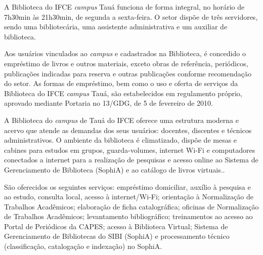 \documentclass[
	12pt,				%
	openright,			%
	twoside,			%
	a4paper,			%
	chapter=TITLE,		%
	english,			%
	french,				%
	spanish,			%
	brazil,				%
	]{abntex2}
\begin{document}
A Biblioteca do IFCE \textit{campus} Tauá funciona de forma integral, no horário de 7h30min às 21h30min, de segunda a sexta-feira. O setor dispõe de três servidores, sendo uma bibliotecária,  uma assistente administrativa e um auxiliar de biblioteca.

Aos usuários vinculados ao \textit{campus} e cadastrados na Biblioteca, é concedido o empréstimo de livros e outros materiais, exceto obras de referência, periódicos, publicações indicadas para reserva e outras publicações conforme recomendação do setor. As formas de empréstimo, bem como o uso e oferta de serviços da Biblioteca do IFCE \textit{campus} Tauá, são estabelecidos em regulamento próprio, aprovado mediante Portaria no 13/GDG, de 5 de fevereiro de 2010. 

A Biblioteca do \textit{campus} de Tauá do IFCE oferece uma estrutura moderna e acervo que atende as demandas dos seus usuários: docentes, discentes e técnicos administrativos. O ambiente da biblioteca é climatizado, dispõe de mesas e cabines para estudos em grupos, guarda-volumes, internet Wi-Fi e computadores conectados a internet para a realização de pesquisas e acesso online ao Sistema de Gerenciamento de Biblioteca (SophiA) e ao catálogo de livros virtuais..

São oferecidos os seguintes serviços: empréstimo domiciliar, auxílio à pesquisa e ao estudo, consulta local, acesso à internet/Wi-Fi; orientação à Normalização de Trabalhos Acadêmicos; elaboração de ficha catalográfica; oficinas de Normalização de Trabalhos Acadêmicos; levantamento bibliográfico; treinamentos ao acesso ao Portal de Periódicos da CAPES; acesso à Biblioteca Virtual; Sistema de Gerenciamento de Bibliotecas do SIBI (SophiA) e processamento técnico (classificação, catalogação e indexação) no SophiA.
%
%
\end{document}
